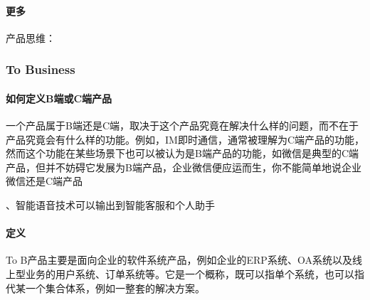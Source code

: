 \documentclass[letterpaper,11pt,english]{sphinxmanual}
\begin{document}
\paragraph{更多}
\label{\detokenize{chapter_introduction/Product:id49}}
产品思维：


\subsubsection{To Business}
\label{\detokenize{chapter_introduction/2B:to-business}}\label{\detokenize{chapter_introduction/2B::doc}}

\paragraph{如何定义B端或C端产品}
\label{\detokenize{chapter_introduction/2B:bc}}
一个产品属于B端还是C端，取决于这个产品究竟在解决什么样的问题，而不在于产品究竟会有什么样的功能。例如，IM即时通信，通常被理解为C端产品的功能，然而这个功能在某些场景下也可以被认为是B端产品的功能，如微信是典型的C端产品，但并不妨碍它发展为B端产品，企业微信便应运而生，你不能简单地说企业微信还是C端产品
%
\begin{footnote}[32]\sphinxAtStartFootnote
{}
%
\end{footnote}、智能语音技术可以输出到智能客服和个人助手
%
\begin{footnote}[33]\sphinxAtStartFootnote
{}
%
\end{footnote}


\paragraph{定义}
\label{\detokenize{chapter_introduction/2B:id1}}
To
B产品主要是面向企业的软件系统产品，例如企业的ERP系统、OA系统以及线上型业务的用户系统、订单系统等。它是一个概称，既可以指单个系统，也可以指代某一个集合体系，例如一整套的解决方案。
%
\begin{footnote}[34]\sphinxAtStartFootnote
{}
%
\end{footnote}
\end{document}
